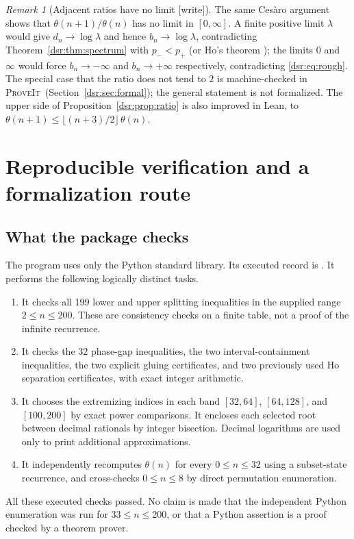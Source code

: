 \documentclass[11pt,a4paper]{article}
\numberwithin{equation}{section}
\theoremstyle{definition}
\theoremstyle{remark}
\newtheorem{remark}[theorem]{Remark}
\newcommand{\repo}{\textsc{ProveIt}}
\newcommand{\code}[1]{\texttt{\detokenize{#1}}}
\newcommand{\wtag}{\textup{[write]}}
\theoremstyle{definition}
\theoremstyle{plain}
\begin{document}
\begin{remark}[Adjacent ratios have no limit \wtag]
\label{dsr:rem:ratio}
The same Ces\`aro argument shows that $\theta(n+1)/\theta(n)$ has no limit
in $[0,\infty]$. A finite positive limit $\lambda$ would give
$d_n\to\log\lambda$ and hence $b_n\to\log\lambda$, contradicting
Theorem~\ref{dsr:thm:spectrum} with $p_-<p_+$ (or Ho's theorem \cite{Ho});
the limits $0$ and $\infty$ would force $b_n\to-\infty$ and
$b_n\to+\infty$ respectively, contradicting
\eqref{dsr:eq:rough}. The special case that the ratio does not tend to $2$ is
machine-checked in \repo\ (Section~\ref{dsr:sec:formal}); the general
statement is not formalized. The upper side of
Proposition~\ref{dsr:prop:ratio} is also improved in Lean, to
$\theta(n+1)\le\lfloor(n+3)/2\rfloor\,\theta(n)$.
\end{remark}

\section{Reproducible verification and a formalization route}
\label{dsr:sec:verification}

\subsection{What the package checks}
The program \code{verify.py} uses only the Python standard library. Its
executed record is \code{verification.json}. It performs the following
logically distinct tasks.
\begin{enumerate}
\item It checks all 199 lower and upper splitting inequalities in the supplied
range $2\le n\le200$. These are consistency checks on a finite table, not a
proof of the infinite recurrence.
\item It checks the 32 phase-gap inequalities, the two interval-containment
inequalities, the two explicit gluing certificates, and two previously used
Ho separation certificates, with exact integer arithmetic.
\item It chooses the extremizing indices in each band $[32,64]$, $[64,128]$,
and $[100,200]$ by exact power comparisons. It encloses each selected root
between decimal rationals by integer bisection. Decimal logarithms are used
only to print additional approximations.
\item It independently recomputes $\theta(n)$ for every $0\le n\le32$ using
a subset-state recurrence, and cross-checks $0\le n\le8$ by direct
permutation enumeration.
\end{enumerate}
All these executed checks passed. No claim is made that the independent
Python enumeration was run for $33\le n\le200$, or that a Python assertion is
a proof checked by a theorem prover.
\end{document}
